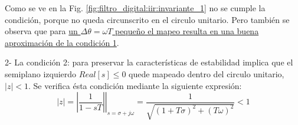 \documentclass[informe.tex]{subfiles}
\begin{document}
{Como se ve en la Fig. \ref{fig:filtro_digital:iir:invariante_1} no se cumple la condición, porque no queda circunscrito en el circulo unitario. Pero también se observa que para \underline{un $\Delta \theta=\omega T$ pequeño el mapeo resulta en una buena aproximación de la condición 1}.\newline

2- La condición 2: para preservar la características de estabilidad implica que el semiplano izquierdo $Real[s] \leq 0$ quede mapeado dentro del circulo unitario, $|z|<1$. Se verifica ésta condición mediante la siguiente expresión:
		$$
			\left| z \right| 
			= 
			\left. \left| \frac{1}{1-sT} \right| \right|_{s=\sigma + j \omega}
			=
			\frac{
					1
			   }{
			   		\sqrt{ \left(1+T\sigma \right)^2 + \left(T\omega \right)^2}
			   }
			   <1
		$$		
		
}

\newpage
\end{document}
